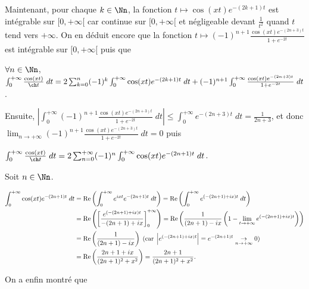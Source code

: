 {{Maintenant, pour chaque $k\in\Nn$, la fonction $t\mapsto\cos(xt)e^{-(2k+1)t}$ est intégrable sur $[0,+\infty[$ car continue sur $[0,+\infty[$ et négligeable devant $\frac{1}{t^2}$ quand $t$ tend vers $+\infty$. On en déduit encore que la fonction $t\mapsto (-1)^{n+1}\frac{\cos(xt)e^{-(2n+3)t}}{1+e^{-2t}}$ est intégrable sur $[0,+\infty[$ puis que 

\begin{center}
$\forall n\in\Nn$, $\int_{0}^{+\infty}\frac{\cos(xt)}{\ch t}\;dt=2\sum_{k=0}^{n}(-1)^k\int_{0}^{+\infty}\cos(xt)e^{-(2k+1)t}\;dt+(-1)^{n+1}\int_{0}^{+\infty}\frac{\cos(xt)e^{-(2n+3)t}}{1+e^{-2t}}\;dt$.
\end{center}

Ensuite, $\left|\int_{0}^{+\infty}(-1)^{n+1}\frac{\cos(xt)e^{-(2n+3)t}}{1+e^{-2t}}\;dt\right|\leqslant\int_{0}^{+\infty}e^{-(2n+3)t}\;dt=\frac{1}{2n+3}$, et donc $\lim_{n \rightarrow +\infty}(-1)^{n+1}\frac{\cos(xt)e^{-(2n+3)t}}{1+e^{-2t}}\;dt=0$ puis

\begin{center}
$\int_{0}^{+\infty}\frac{\cos(xt)}{\ch t}\;dt=2\sum_{n=0}^{+\infty}(-1)^n\int_{0}^{+\infty}\cos(xt)e^{-(2n+1)t}\;dt$.
\end{center}

Soit $n\in\Nn$.

\begin{align*}\ensuremath
\int_{0}^{+\infty}\cos(xt)e^{-(2n+1)t}\;dt&=\text{Re}\left(\int_{0}^{+\infty}e^{ixt}e^{-(2n+1)t}\;dt\right)=\text{Re}\left(\int_{0}^{+\infty}e^{(-(2n+1)+ix)t}\;dt\right)\\
 &=\text{Re}\left(\left[\frac{e^{(-(2n+1)+ix)t}}{-(2n+1)+ix}\right]_0^{+\infty}\right)=\text{Re}\left(\frac{1}{(2n+1)-ix}\left(1-\lim_{t \rightarrow +\infty}e^{(-(2n+1)+ix)t}\right)\right)\\
 &=\text{Re}\left(\frac{1}{(2n+1)-ix}\right)\;(\text{car}\;\left|e^{(-(2n+1)+ix)t}\right|=e^{-(2n+1)t}\underset{n\rightarrow+\infty}{\rightarrow}0)\\
 &=\text{Re}\left(\frac{2n+1+ix}{(2n+1)^2+x^2}\right)=\frac{2n+1}{(2n+1)^2+x^2}.
\end{align*}

On a enfin montré que

\begin{center}
\end{center}}
}